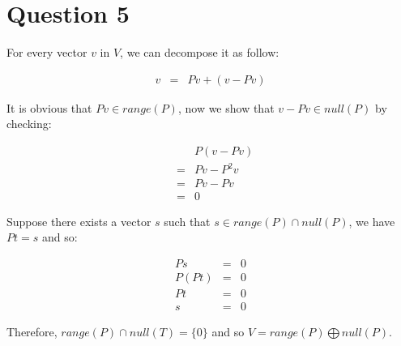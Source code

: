 \section*{Question 5}
For every vector $ v $ in $ V $, we can decompose it as follow:

\begin{eqnarray*}
  v &=& Pv + (v - Pv)
\end{eqnarray*}

It is obvious that $ Pv \in range(P) $, now we show that $ v - Pv \in null(P) $ by checking:

\begin{eqnarray*}
  & & P(v - Pv) \\ 
  &=& Pv - P^2v \\
  &=& Pv - Pv \\
  &=& 0 
\end{eqnarray*}

Suppose there exists a vector $ s $ such that $ s \in range(P) \cap null(P) $, we have $ Pt = s $ and so:

\begin{eqnarray*}
     Ps &=& 0 \\
  P(Pt) &=& 0 \\
     Pt &=& 0 \\
      s &=& 0
\end{eqnarray*}

Therefore, $ range(P) \cap null(T) = \{0\} $ and so $ V = range(P) \bigoplus null(P) $.
